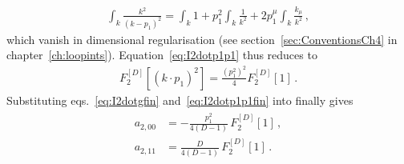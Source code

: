 \begin{enumerate}[a)]
\begin{align}
\int_k \frac{k^2}{(k-p_1)^2} = \int_k 1 + p_1^2 \int_k \frac{1}{k^2} + 2 p_1^{\mu} \int_k \frac{k_{\mu}}{k^2} \,,
\end{align}
which vanish in dimensional regularisation (see section~\ref{sec:ConventionsCh4} in chapter~\ref{ch:loopints}).
Equation~\eqref{eq:I2dotp1p1} thus reduces to
\begin{align} \label{eq:I2dotp1p1fin}
F_2^{[D]}\left[ (k\cdot p_1)^2 \right] = 
  \frac{(p_1^2)^2}{4} F_2^{[D]}[1] \,.
\end{align}
Substituting eqs.~\eqref{eq:I2dotgfin} and~\eqref{eq:I2dotp1p1fin} into  finally gives
\begin{align}
\begin{aligned}
a_{2,00} & = -\frac{p_1^2}{4 (D-1)} \, F_2^{[D]}\left[1 \right]  \,, \\
a_{2,11} & = \frac{D}{4 (D-1)} \, F_2^{[D]}\left[1 \right] \,.
\end{aligned}
\end{align}



\end{enumerate}
